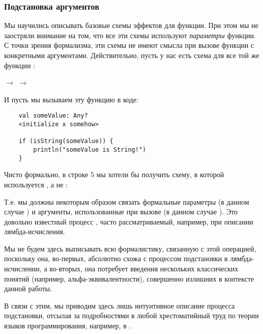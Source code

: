 \subsubsection{Подстановка аргументов}

\label{section-arguments-substitution}

Мы научились описывать базовые схемы эффектов для функции. При этом мы не заостряли внимание на том, что все эти схемы используют \emph{параметры} функции. С точки зрения формализма, эти схемы не имеют смысла при вызове функции с конкретными аргументами. Действительно, пусть у нас есть схема для все той же функции :

{
         $\rightarrow$ 
         $\rightarrow$ 
}
{}

И пусть мы вызываем эту функцию в коде:

\begin{verbatim}
    val someValue: Any?
    <initialize x somehow>
    
    if (isString(someValue)) {
        println("someValue is String!")
    }
\end{verbatim}

Чисто формально, в строке 5 мы хотели бы получить схему, в которой используется , а не :


Т.е. мы должны некоторым образом связать формальные параметры (в данном случае ) и аргументы, использованные при вызове (в данном случае ). Это довольно известный процесс , часто рассматриваемый, например, при описании лямбда-исчисления. 

Мы не будем здесь выписывать всю формалистику, связанную с этой операцией, поскольку она, во-первых, абсолютно схожа с процессом подстановки в лямбда-исчислении, а во-вторых, она потребует введения нескольких классических понятий (например, альфа-эквивалентности), совершенно излишних в контексте данной работы. 

В связи с этим, мы приводим здесь лишь интуитивное описание процесса подстановки, отсылая за подробностями в любой хрестоматийный труд по теории языков программирования, например, в \cite{TAPL}.

